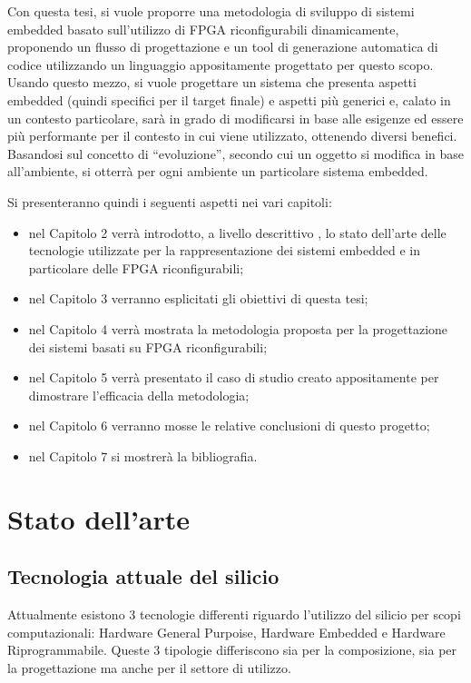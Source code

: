 \documentclass[a4paper,titlepage]{book}
\begin{document}
Con questa tesi, si vuole proporre una metodologia di sviluppo di sistemi embedded basato sull'utilizzo di FPGA riconfigurabili dinamicamente, proponendo un flusso di progettazione e un tool di generazione automatica di codice utilizzando un linguaggio appositamente progettato per questo scopo. Usando questo mezzo, si vuole progettare un sistema che presenta aspetti embedded (quindi specifici per il target finale) e aspetti più generici e, calato in un contesto particolare, sarà in grado di modificarsi in base alle esigenze ed essere più performante per il contesto in cui viene utilizzato, ottenendo diversi benefici. Basandosi sul concetto di ``evoluzione'', secondo cui un oggetto si modifica in base all'ambiente, si otterrà per ogni ambiente un particolare sistema embedded.

Si presenteranno quindi i seguenti aspetti nei vari capitoli:

\begin{itemize}
\item nel Capitolo 2 verrà introdotto, a livello descrittivo , lo stato dell'arte delle tecnologie utilizzate per la rappresentazione dei sistemi embedded e in particolare delle FPGA riconfigurabili; 
\item nel Capitolo 3 verranno esplicitati gli obiettivi di questa tesi; 
\item nel Capitolo 4 verrà mostrata la metodologia proposta per la progettazione dei sistemi basati su FPGA riconfigurabili; 
\item nel Capitolo 5 verrà presentato il caso di studio creato appositamente per dimostrare l'efficacia della metodologia;
\item nel Capitolo 6 verranno mosse le relative conclusioni di questo progetto;
\item nel Capitolo 7 si mostrerà la bibliografia.
\end{itemize}

\chapter{Stato dell'arte}

\section{Tecnologia attuale del silicio}
Attualmente esistono 3 tecnologie differenti riguardo l'utilizzo del silicio per scopi computazionali: Hardware General Purpoise, Hardware Embedded e Hardware Riprogrammabile. Queste 3 tipologie differiscono sia per la composizione, sia per la progettazione ma anche per il settore di utilizzo.
\end{document}
